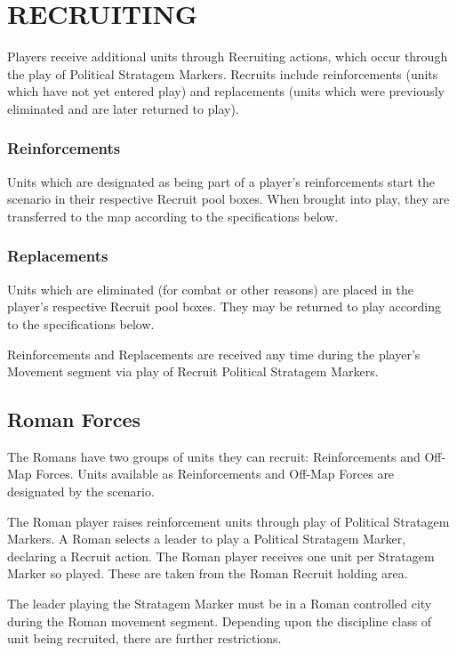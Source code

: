 \section{RECRUITING}

Players receive additional units through Recruiting actions, which occur through the play of Political Stratagem Markers. Recruits include reinforcements (units which have not yet entered play) and replacements (units which were previously eliminated and are later returned to play).

\addtocounter{subsection}{1}
\subsubsection{Reinforcements}

Units which are designated as being part of a player's reinforcements start the scenario in their respective Recruit pool boxes. When brought into play, they are transferred to the map according to the specifications below.

\subsubsection{Replacements}

Units which are eliminated (for combat or other reasons) are placed in the player's respective Recruit pool boxes. They may be returned to play according to the specifications below.

Reinforcements and Replacements are received any time during the player's Movement segment via play of Recruit Political Stratagem Markers.

\subsection{Roman Forces}

The Romans have two groups of units they can recruit: Reinforcements and Off-Map Forces. Units available as Reinforcements and Off-Map Forces are designated by the scenario.

The Roman player raises reinforcement units through play of Political Stratagem Markers. A Roman selects a leader to play a Political Stratagem Marker, declaring a Recruit action. The Roman player receives one unit per Stratagem Marker so played. These are taken from the Roman Recruit holding area.

The leader playing the Stratagem Marker must be in a Roman controlled city during the Roman movement segment. Depending upon the discipline class of unit being recruited, there are further restrictions.

